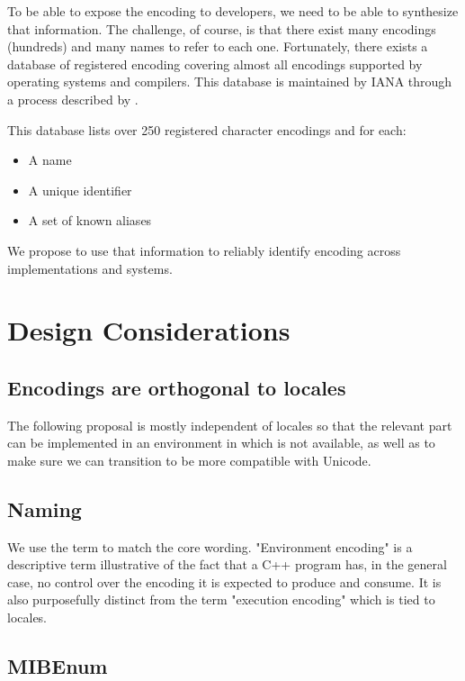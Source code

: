 \documentclass{wg21}
\begin{document}
To be able to expose the encoding to developers, we need to be able to synthesize that information.
The challenge, of course, is that there exist many encodings (hundreds) and many names to refer to each one.
Fortunately, there exists a database of registered encoding covering almost all encodings supported by operating systems and compilers.
This database is maintained by IANA through a process described by \cite{rfc2978}.

This database lists over 250 registered character encodings and for each:
\begin{itemize}
    \item A name
    \item A unique identifier
    \item A set of known aliases
\end{itemize}

We propose to use that information to reliably identify encoding across implementations and systems.


\section{Design Considerations}

\subsection{Encodings are orthogonal to locales}

The following proposal is mostly independent of locales so that the relevant part can be implemented in an environment in which 
is not available, as well as to make sure we can transition  to be more compatible with Unicode.

\subsection{Naming}

We use the term  to match the core wording.
"Environment encoding" is a descriptive term illustrative of the
fact that a C++ program has, in the general case, no control over the encoding it is expected to produce and consume. It is also purposefully
distinct from the term "execution encoding" which is tied to locales.

\subsection{MIBEnum}
\end{document}
